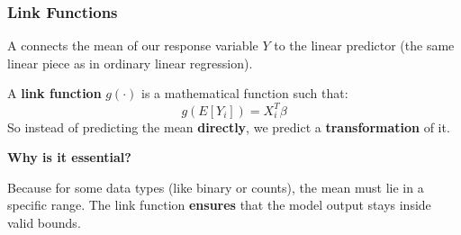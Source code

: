 \subsubsection{Link Functions}

A  connects the mean of our response variable $Y$ to the linear predictor (the same linear piece as in ordinary linear regression).

\highspace
A \textbf{link function} $g(\cdot)$ is a mathematical function such that:
\begin{equation}
    g(E[Y_i]) = X_i^T \beta
\end{equation}
So instead of predicting the mean \textbf{directly}, we predict a \textbf{transformation} of it.

\highspace
\begin{flushleft}
    \textcolor{Green3}{ \textbf{Why is it essential?}}
\end{flushleft}
Because for some data types (like binary or counts), the mean must lie in a specific range. The link function \textbf{ensures} that the model output stays inside valid bounds.


